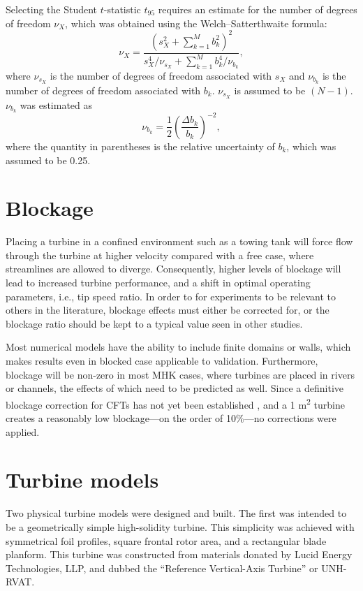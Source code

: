 Selecting the Student $t$-statistic $t_{95}$ requires an estimate for the number
of degrees of freedom $\nu_X$, which was obtained using the Welch--Satterthwaite
formula:
\begin{equation}
    \nu_X = \frac{\left(s_X^2 + \sum_{k=1}^M b_k^2 \right)^2} {s_X^4/\nu_{s_X} +
    \sum_{k=1}^M b_k^4/\nu_{b_k}},
\end{equation}
where $\nu_{s_X}$ is the number of degrees of freedom associated with $s_X$ and
$\nu_{b_k}$ is the number of degrees of freedom associated with $b_k$.
$\nu_{s_X}$ is assumed to be $(N-1)$. $\nu_{b_k}$ was estimated as
\begin{equation}
    \nu_{b_k} = \frac{1}{2} \left( \frac{\Delta b_k}{b_k} \right)^{-2},
\end{equation}
where the quantity in parentheses is the relative uncertainty of $b_k$, which
was assumed to be 0.25.


\section{Blockage}

Placing a turbine in a confined environment such as a towing tank will force
flow through the turbine at higher velocity compared with a free case, where
streamlines are allowed to diverge. Consequently, higher levels of blockage will
lead to increased turbine performance, and a shift in optimal operating
parameters, i.e., tip speed ratio. In order to for experiments to be relevant to
others in the literature, blockage effects must either be corrected for, or the
blockage ratio should be kept to a typical value seen in other studies.

Most numerical models have the ability to include finite domains or walls, which
makes results even in blocked case applicable to validation. Furthermore,
blockage will be non-zero in most MHK cases, where turbines are placed in rivers
or channels, the effects of which need to be predicted as well. Since a
definitive blockage correction for CFTs has not yet been established
\cite{Cavagnaro2014, Dossena2015}, and a 1 m\textsuperscript{2} turbine creates
a reasonably low blockage---on the order of 10\%---no corrections were applied.


\section{Turbine models}

Two physical turbine models were designed and built. The first was intended to
be a geometrically simple high-solidity turbine. This simplicity was achieved
with symmetrical foil profiles, square frontal rotor area, and a rectangular
blade planform. This turbine was constructed from materials donated by Lucid
Energy Technologies, LLP, and dubbed the ``Reference Vertical-Axis Turbine'' or
UNH-RVAT.

